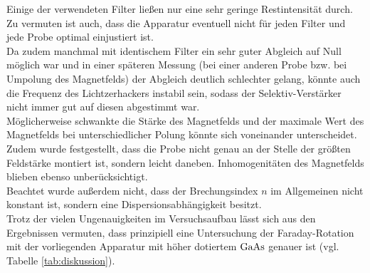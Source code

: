 Einige der verwendeten Filter ließen nur eine sehr geringe Restintensität durch.
Zu vermuten ist auch, dass die Apparatur eventuell nicht für jeden Filter und jede Probe optimal einjustiert ist.\\
Da zudem manchmal mit identischem Filter ein sehr guter Abgleich auf Null möglich war und in einer späteren Messung (bei einer anderen Probe bzw. bei Umpolung des Magnetfelds) der Abgleich deutlich schlechter gelang, könnte auch die Frequenz des Lichtzerhackers instabil sein, sodass der Selektiv-Verstärker nicht immer gut auf diesen abgestimmt war.\\
Möglicherweise schwankte die Stärke des Magnetfelds und der maximale Wert des Magnetfelds bei unterschiedlicher Polung könnte sich voneinander unterscheidet. Zudem wurde festgestellt, dass die Probe nicht genau an der Stelle der größten Feldstärke montiert ist, sondern leicht daneben. Inhomogenitäten des Magnetfelds blieben ebenso unberücksichtigt.\\
Beachtet wurde außerdem nicht, dass der Brechungsindex $n$ im Allgemeinen nicht konstant ist, sondern eine Dispersionsabhängigkeit besitzt.\\

Trotz der vielen Ungenauigkeiten im Versuchsaufbau lässt sich aus den Ergebnissen vermuten, dass prinzipiell eine Untersuchung der Faraday-Rotation mit der vorliegenden Apparatur mit höher dotiertem $\ce{GaAs}$ genauer ist (vgl. Tabelle \ref{tab:diskussion}).

